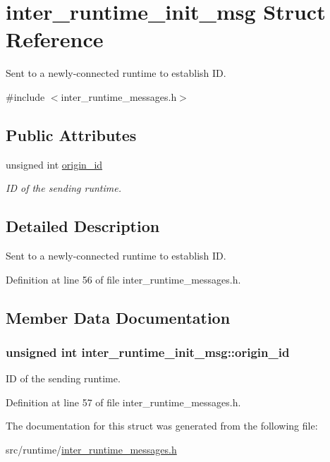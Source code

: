 \hypertarget{structinter__runtime__init__msg}{\section{inter\-\_\-runtime\-\_\-init\-\_\-msg Struct Reference}
\label{structinter__runtime__init__msg}
}


Sent to a newly-\/connected runtime to establish I\-D.  




{\ttfamily \#include $<$inter\-\_\-runtime\-\_\-messages.\-h$>$}

\subsection*{Public Attributes}
\begin{DoxyCompactItemize}
\item 
unsigned int \hyperlink{structinter__runtime__init__msg_a8c8d29e7a9b0fc577109278b7ba1a127}{origin\-\_\-id}
\begin{DoxyCompactList}\small\item\em I\-D of the sending runtime. \end{DoxyCompactList}\end{DoxyCompactItemize}


\subsection{Detailed Description}
Sent to a newly-\/connected runtime to establish I\-D. 

Definition at line 56 of file inter\-\_\-runtime\-\_\-messages.\-h.



\subsection{Member Data Documentation}
\hypertarget{structinter__runtime__init__msg_a8c8d29e7a9b0fc577109278b7ba1a127}{
\subsubsection[{origin\-\_\-id}]{\setlength{\rightskip}{0pt plus 5cm}unsigned int inter\-\_\-runtime\-\_\-init\-\_\-msg\-::origin\-\_\-id}}\label{structinter__runtime__init__msg_a8c8d29e7a9b0fc577109278b7ba1a127}


I\-D of the sending runtime. 



Definition at line 57 of file inter\-\_\-runtime\-\_\-messages.\-h.



The documentation for this struct was generated from the following file\-:\begin{DoxyCompactItemize}
\item 
src/runtime/\hyperlink{inter__runtime__messages_8h}{inter\-\_\-runtime\-\_\-messages.\-h}\end{DoxyCompactItemize}
